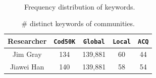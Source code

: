 \begin{figure}[h]
    \centering
    \mbox{
        \hspace{2ex}
    }
    \caption{Frequency distribution of keywords.}\label{fig:freq50}
\end{figure}

\vspace{-0.2cm}
\begin{table}[h]
  \centering \footnotesize \caption {\# distinct keywords of communities.}
  \label{tab:kws}
  \begin{tabular}{c|c|c|c|c}
     \hline
          \bf{Researcher}            & {\tt Cod50K} &  \bf{{\tt Global}} & {\tt Local} & {\tt ACQ}\\
     \hline\hline
          Jim Gray   &     134       & 139,881      &     60     &    44    \\
     \hline
          Jiawei Han &     140       & 139,881      &     58     &    54\\
     \hline
  \end{tabular}
\end{table}

